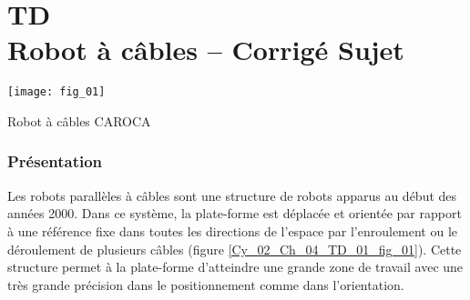 \chapter*{TD  \\ 
Robot à câbles -- 
\ifprof Corrigé \else Sujet \fi}

\iflivret {} \else
\ifprof  {} \else \fi
\fi

\setcounter{question}{0}

\begin{marginfigure}
\centering
\texttt{[image: fig\_01]}
\caption{Robot à câbles CAROCA \label{Cy_02_Ch_04_TD_01_fig_01}}
\end{marginfigure}


\subsection*{Présentation}
\ifprof
\else
 Les robots parallèles à câbles sont une structure de robots apparus au début des années 2000. Dans ce système, la plate-forme est déplacée et orientée par rapport à une référence fixe dans toutes les directions de l’espace par l’enroulement ou le déroulement de plusieurs câbles (figure \ref{Cy_02_Ch_04_TD_01_fig_01}). Cette structure permet à la plate-forme d’atteindre une grande zone de travail avec une très grande précision dans le positionnement comme dans l’orientation.

%
\fi

